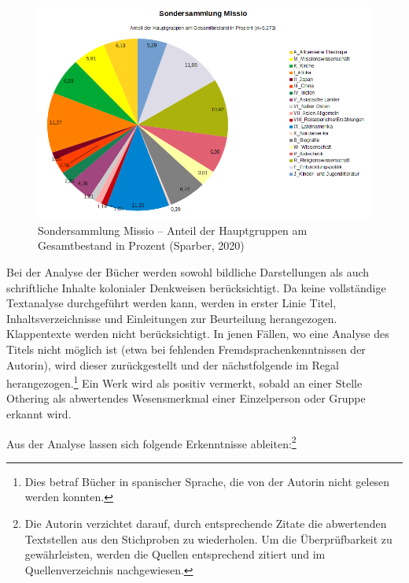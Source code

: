 \documentclass[a4paper,
fontsize=11pt,
oneside,
numbers=noperiodatend,
parskip=half-,
bibliography=totoc,
final
]{scrartcl}
\begin{document}
\begin{figure}
\centering
\includegraphics[width=.95\textwidth]{img/img2.PNG}
\caption{Sondersammlung Missio -- Anteil der Hauptgruppen am
Gesamtbestand in Prozent (Sparber, 2020)}
\end{figure}

Bei der Analyse der Bücher werden sowohl bildliche Darstellungen als
auch schriftliche Inhalte kolonialer Denkweisen berücksichtigt. Da keine
vollständige Textanalyse durchgeführt werden kann, werden in erster
Linie Titel, Inhaltsverzeichnisse und Einleitungen zur Beurteilung
herangezogen. Klappentexte werden nicht berücksichtigt. In jenen Fällen,
wo eine Analyse des Titels nicht möglich ist (etwa bei fehlenden
Fremdsprachenkenntnissen der Autorin), wird dieser zurückgestellt und
der nächstfolgende im Regal herangezogen.\footnote{Dies betraf Bücher in
  spanischer Sprache, die von der Autorin nicht gelesen werden konnten.}
Ein Werk wird als positiv vermerkt, sobald an einer Stelle Othering als
abwertendes Wesensmerkmal einer Einzelperson oder Gruppe erkannt wird.

Aus der Analyse lassen sich folgende Erkenntnisse ableiten:\footnote{Die
  Autorin verzichtet darauf, durch entsprechende Zitate die abwertenden
  Textstellen aus den Stichproben zu wiederholen. Um die Überprüfbarkeit
  zu gewährleisten, werden die Quellen entsprechend zitiert und im
  Quellenverzeichnis nachgewiesen.}
\end{document}
